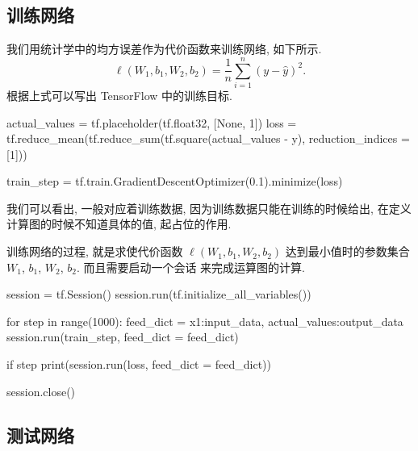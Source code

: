 \subsection{训练网络}
\begin{frame}[fragile]{\insertsection}{\insertsubsection}
我们用统计学中的均方误差作为代价函数来训练网络, 如下所示.%
%
\[
  \ell(W_1, b_1, W_2, b_2) = \frac{1}{n}\sum_{i = 1}^n (y - \hat{y})^2\text{.}
\]%
%
根据上式可以写出 TensorFlow 中的训练目标.
\begin{pythoncode}
actual_values = tf.placeholder(tf.float32, [None, 1])
loss = tf.reduce_mean(tf.reduce_sum(tf.square(actual_values - y), reduction_indices = [1]))

train_step = tf.train.GradientDescentOptimizer(0.1).minimize(loss)
\end{pythoncode}

我们可以看出,  一般对应着训练数据, 因为训练数据只能在训练的时候给出, 在定义计算图的时候不知道具体的值,  起占位的作用.
\end{frame}

\begin{frame}[fragile]{\insertsection}{\insertsubsection}
训练网络的过程, 就是求使代价函数 $\ell(W_1, b_1, W_2, b_2)$ 达到最小值时的参数集合 $W_1$, $b_1$, $W_2$, $b_2$. 而且需要启动一个会话  来完成运算图的计算.

\begin{pythoncode}
session = tf.Session()
session.run(tf.initialize_all_variables())

for step in range(1000):
    feed_dict = {x1:input_data, actual_values:output_data}
    session.run(train_step, feed_dict = feed_dict)

    if step %
        print(session.run(loss, feed_dict = feed_dict))

session.close()
\end{pythoncode}
\end{frame}

\subsection{测试网络}

\subsection{}